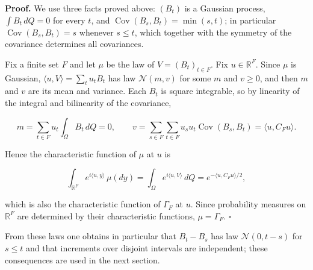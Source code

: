 \documentclass[11pt,a4paper]{article}
\begin{document}
\textbf{Proof.} We use three facts proved above: \((B_t)\) is a Gaussian process, \(\int B_t\,dQ=0\) for every \(t\), and \(\operatorname{Cov}(B_s,B_t)=\min(s,t)\); in particular \(\operatorname{Cov}(B_s,B_t)=s\) whenever \(s\le t\), which together with the symmetry of the covariance determines all covariances.




Fix a finite set \(F\) and let \(\mu\) be the law of \(V=(B_t)_{t\in F}\). Fix \(u\in\mathbb R^F\). Since \(\mu\) is Gaussian, \(\langle u,V\rangle=\sum_tu_tB_t\) has law \(\mathcal N(m,v)\) for some \(m\) and \(v\ge0\), and then \(m\) and \(v\) are its mean and variance. Each \(B_t\) is square integrable, so by linearity of the integral and bilinearity of the covariance,


\[m=\sum_{t\in F}u_t\int_\Omega B_t\,dQ=0,\qquad v=\sum_{s\in F}\sum_{t\in F}u_su_t\operatorname{Cov}(B_s,B_t)=\langle u,C_Fu\rangle.\]


Hence the characteristic function of \(\mu\) at \(u\) is


\[\int_{\mathbb R^F}e^{i\langle u,y\rangle}\,\mu(dy)=\int_\Omega e^{i\langle u,V\rangle}\,dQ=e^{-\langle u,C_Fu\rangle/2},\]


which is also the characteristic function of \(\Gamma_F\) at \(u\). Since probability measures on \(\mathbb R^F\) are determined by their characteristic functions, \(\mu=\Gamma_F\). \(\square\)




From these laws one obtains in particular that \(B_t-B_s\) has law \(\mathcal N(0,t-s)\) for \(s\le t\) and that increments over disjoint intervals are independent; these consequences are used in the next section.
\end{document}
